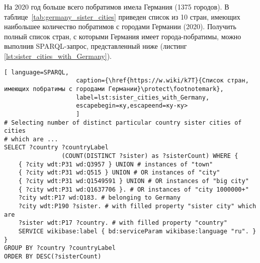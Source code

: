 На 2020 год больше всего побратимов имела Германия (\num{1375} городов). В таблице~\ref{tab:germany_sister_cities} приведен список из 10 стран, имеющих наибольшее количество побратимов с городами Германии (2020). Получить полный список стран, с которыми Германия имеет города-побратимы, можно выполнив SPARQL-запрос, представленный ниже (листинг \ref{lst:sister_cities_with_Germany}).

\begin{lstlisting}[ language=SPARQL, 
                    caption={\href{https://w.wiki/k7T}{Список стран, имеющих побратимы с городами Германии}\protect\footnotemark},
                    label=lst:sister_cities_with_Germany, 
                    escapebegin=ку,escapeend=ку-ку>
                    ]
# Selecting number of distinct particular country sister cities of cities 
# which are ...
SELECT ?country ?countryLabel 
				(COUNT(DISTINCT ?sister) as ?sisterCount) WHERE {                                                          
	{ ?city wdt:P31 wd:Q3957 } UNION # instances of "town"
	{ ?city wdt:P31 wd:Q515 } UNION # OR instances of "city"
	{ ?city wdt:P31 wd:Q1549591 } UNION # OR instances of "big city"      
	{ ?city wdt:P31 wd:Q1637706 }. # OR instances of "city 1000000+"
	?city wdt:P17 wd:Q183. # belonging to Germany  
	?city wdt:P190 ?sister. # with filled property "sister city" which are
	?sister wdt:P17 ?country. # with filled property "country"
	SERVICE wikibase:label { bd:serviceParam wikibase:language "ru". }
}
GROUP BY ?country ?countryLabel
ORDER BY DESC(?sisterCount)\end{lstlisting}

